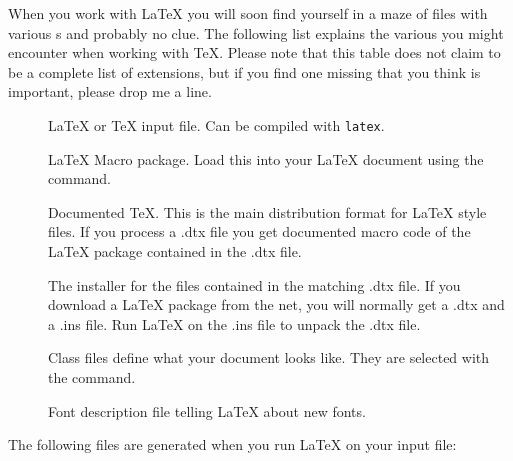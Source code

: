 When you work with \LaTeX{} you will soon find yourself in a maze of
files with various s and probably no clue. The following
list explains the various  you might encounter when
working with \TeX{}. Please note that this table does not claim to be
a complete list of extensions, but if you find one missing that you
think is important, please drop me a line.

\begin{description}
  
\item[] \LaTeX{} or \TeX{} input file. Can be compiled with
  \texttt{latex}.
\item[] \LaTeX{} Macro package. Load this
  into your \LaTeX{} document using the  command.
\item[] Documented \TeX{}. This is the main distribution
  format for \LaTeX{} style files. If you process a .dtx file you get
  documented macro code of the \LaTeX{} package contained in the .dtx
  file.
\item[] The installer for the files contained in the
  matching .dtx file. If you download a \LaTeX{} package from the net,
  you will normally get a .dtx and a .ins file. Run \LaTeX{} on the
  .ins file to unpack the .dtx file.
\item[] Class files define what your document looks
  like. They are selected with the  command.
\item[] Font description file telling  \LaTeX{} about new fonts.
\end{description}
The following files are generated when you run \LaTeX{} on your input
file:

